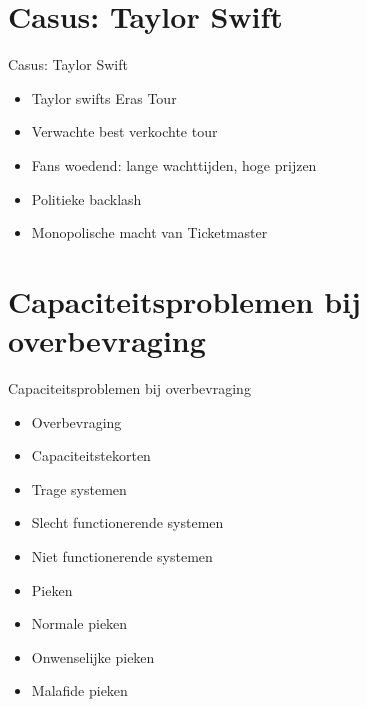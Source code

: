 \documentclass{beamer}
\begin{document}
\section[Casus Taylor]{Casus: Taylor Swift} %
\begin{frame}{Casus: Taylor Swift}
    \begin{itemize}
        \item Taylor swifts Eras Tour
        \item Verwachte best verkochte tour
        \item Fans woedend: lange wachttijden, hoge prijzen
        \item Politieke backlash
        \item Monopolische macht van Ticketmaster
    \end{itemize}
\end{frame}

\section[Capaciteit]{Capaciteitsproblemen bij overbevraging}
\begin{frame}{Capaciteitsproblemen bij overbevraging}
    \begin{itemize}
        \item Overbevraging
        \item Capaciteitstekorten
        \item Trage systemen
        \item Slecht functionerende systemen
        \item Niet functionerende systemen
        \item Pieken
        \item Normale pieken
        \item Onwenselijke pieken
        \item Malafide pieken
    \end{itemize}
\end{frame}
\end{document}
